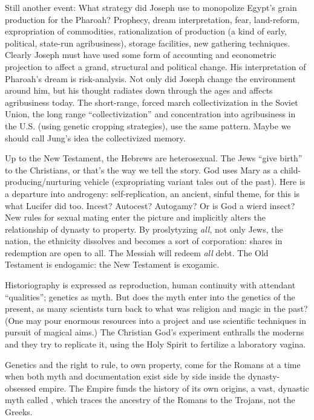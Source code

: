 Still another event: What strategy did Joseph use to monopolize Egypt's grain production for the Pharoah? Prophecy, dream interpretation, fear, land-reform, expropriation of commodities, rationalization of production (a kind of early, political, state-run agribusiness), storage facilities, new gathering techniques. Clearly Joseph must have used some form of accounting and econometric projection to affect a grand, structural and political change. His interpretation of Pharoah's dream is risk-analysis. Not only did Joseph change the environment around him, but his thought radiates down through the ages and affects agribusiness today. The short-range, forced march collectivization in the Soviet Union, the long range \enquote{collectivization} and concentration into agribusiness in the U.S. (using genetic cropping strategies), use the same pattern. Maybe we should call Jung's idea the collectivized memory.

Up to the New Testament, the Hebrews are heterosexual. The Jews \enquote{give birth} to the Christians, or that's the way we tell the story. God uses Mary as a child-producing\slash nurturing vehicle (expropriating variant tales out of the past). Here is a departure into androgeny: self-replication, an ancient, sinful theme, for this is what Lucifer did too. Incest? Autocest? Autogamy? Or is God a wierd insect? New rules for sexual mating enter the picture and implicitly alters the relationship of dynasty to property. By proslytyzing \emph{all}, not only Jews, the nation, the ethnicity dissolves and becomes a sort of corporation: shares in redemption are open to all. The Messiah will redeem \emph{all} debt. The Old Testament is endogamic: the New Testament is exogamic.

Historiography is expressed as reproduction, human continuity with attendant \enquote{qualities}; genetics as myth. But does the myth enter into the genetics of the present, as many scientists turn back to what was religion and magic in the past? (One may pour enormous resources into a project and use scientific techniques in pursuit of magical aims.) The Christian God's experiment enthralls the moderns and they try to replicate it, using the Holy Spirit to fertilize a laboratory vagina.

Genetics and the right to rule, to own property, come for the Romans at a time when both myth and documentation exist side by side inside the dynasty-obsessed empire. The Empire funds the history of its own origins, a vast, dynastic myth called , which traces the ancestry of the Romans to the Trojans, not the Greeks.

